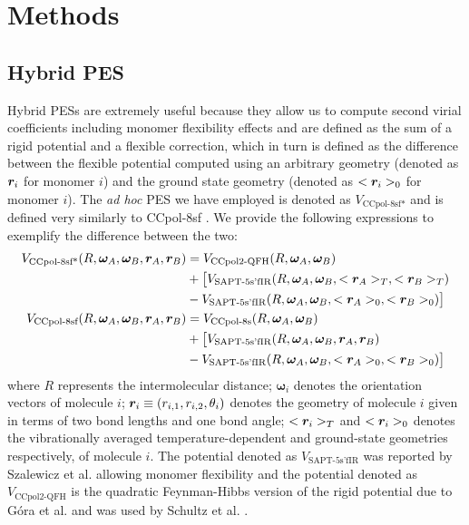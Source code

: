     \section{Methods}
    \label{sec:methods}
        \subsection{Hybrid PES}
        \label{subsec:hybridPES}
            Hybrid PESs are extremely useful because they allow us to compute second virial coefficients including monomer flexibility effects and are defined as the sum of a rigid potential and a flexible correction, which in turn is defined as the difference between the flexible potential computed using an arbitrary geometry (denoted as ${\boldsymbol {r}}_i$ for monomer $i$) and the ground state geometry (denoted as $<{\boldsymbol {r}}_i>_0$ for monomer $i$). The \emph{ad hoc} \abinitio{} PES we have employed is denoted as $V_{\text{CCpol-8sf*}}$ and is defined very similarly to CCpol-8sf \cite{Leforestier2012,Jankowski2015}. We provide the following expressions to exemplify the difference between the two:
            \begin{subequations}
                \label{eq:hybridPESs}
                \begin{align}
                    V_{\text{CCpol-8sf*}} (R, \bm{\omega}_A, \bm{\omega}_B, {\boldsymbol {r}}_A, {\boldsymbol {r}}_B) &= V_{\text{CCpol2-QFH}} (R, \bm{\omega}_A, \bm{\omega}_B)\nonumber\\
                    &+ \big[ V_{\text{SAPT-5s'fIR}} (R, \bm{\omega}_A, \bm{\omega}_B, <{\boldsymbol {r}}_A>_T, <{\boldsymbol {r}}_B>_T)\nonumber\\
                    &- V_{\text{SAPT-5s'fIR}} (R, \bm{\omega}_A, \bm{\omega}_B, <{\boldsymbol {r}}_A>_0, <{\boldsymbol {r}}_B>_0) \big]\label{eq:ccpol8sf*}\\
                    V_{\text{CCpol-8sf}} (R, \bm{\omega}_A, \bm{\omega}_B, {\boldsymbol {r}}_A, {\boldsymbol {r}}_B) &= V_{\text{CCpol-8s}} (R, \bm{\omega}_A, \bm{\omega}_B)\nonumber\\
                    &+ \big[ V_{\text{SAPT-5s'fIR}} (R, \bm{\omega}_A, \bm{\omega}_B, {\boldsymbol {r}}_A, {\boldsymbol {r}}_B)\nonumber\\
                    &- V_{\text{SAPT-5s'fIR}} (R, \bm{\omega}_A, \bm{\omega}_B, <{\boldsymbol {r}}_A>_0, <{\boldsymbol {r}}_B>_0) \big]\label{eq:ccpol8sf}
                \end{align}
            \end{subequations}
            where $R$ represents the intermolecular distance; $\bm{\omega}_i$ denotes the orientation vectors of molecule $i$; ${\boldsymbol {r}}_i \equiv (r_{i,1}, r_{i,2}, \theta_i)$ denotes the geometry of molecule $i$ given in terms of two bond lengths and one bond angle; $<{\boldsymbol {r}}_i>_T$ and $<{\boldsymbol {r}}_i>_0$ denotes the vibrationally averaged temperature-dependent and ground-state geometries respectively, of molecule $i$. The potential denoted as $V_{\text{SAPT-5s'fIR}}$ was reported by Szalewicz et al. \cite{Szalewicz2006} allowing monomer flexibility and the potential denoted as $V_{\text{CCpol2-QFH}}$ is the quadratic Feynman-Hibbs version of the rigid potential due to G\'{o}ra et al. \cite{Gora2014} and was used by Schultz et al. \cite{Schultz2015}.

